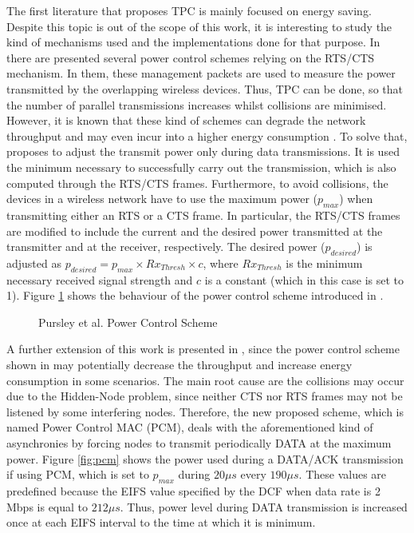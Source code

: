 \documentclass[12pt, a4paper,twoside]{tesi_upf}
\begin{document}
				The first literature that proposes TPC is mainly focused on energy saving. Despite this topic is out of the scope of this work, it is interesting to study the kind of mechanisms used and the implementations done for that purpose. In \cite{agarwal2001distributed, karn1990maca} there are presented several power control schemes relying on the RTS/CTS mechanism. In them, these management packets are used to measure the power transmitted by the overlapping wireless devices. Thus, TPC can be done, so that the number of parallel transmissions increases whilst collisions are minimised. However, it is known that these kind of schemes can degrade the network throughput and may even incur into a higher energy consumption \cite{ebert1999combined}. To solve that, \cite{pursley2000energy} proposes to adjust the transmit power only during data transmissions. It is used the minimum necessary to successfully carry out the transmission, which is also computed through the RTS/CTS frames. Furthermore, to avoid collisions, the devices in a wireless network have to use the maximum power ($p_{max}$) when transmitting either an RTS or a CTS frame. In particular, the RTS/CTS frames are modified to include the current and the desired power transmitted at the transmitter and at the receiver, respectively. The desired power ($p_{desired}$) is adjusted as $p_{desired} = p_{max} \times Rx_{Thresh} \times c$, where $Rx_{Thresh}$ is the minimum necessary received signal strength and $c$ is a constant (which in this case is set to 1). Figure \ref{fig:basic_tpc} shows the behaviour of the power control scheme introduced in \cite{pursley2000energy}.	
				\begin{figure}[h!]
					\centering
					\caption{Pursley et al. Power Control Scheme}
					\label{fig:basic_tpc}
				\end{figure}				
				A further extension of this work is presented in \cite{jung2002power}, since the power control scheme shown in \cite{pursley2000energy} may potentially decrease the throughput and increase energy consumption in some scenarios. The main root cause are the collisions may occur due to the Hidden-Node problem, since neither CTS nor RTS frames may not be listened by some interfering nodes. Therefore, the new proposed scheme, which is named Power Control MAC (PCM), deals with the aforementioned kind of asynchronies by forcing nodes to transmit periodically DATA at the maximum power. Figure \ref{fig:pcm} shows the power used during a DATA/ACK transmission if using PCM, which is set to $p_{max}$ during $20 \mu s$ every $190 \mu s$. These values are predefined because the EIFS value specified by the DCF when data rate is 2 Mbps is equal to $212 \mu s$. Thus, power level during DATA transmission is increased once at each EIFS interval to the time at which it is minimum.
\end{document}
